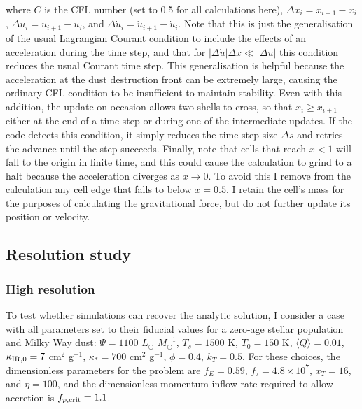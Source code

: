 \documentclass[useAMS,usenatbib]{mn2e}
\begin{document}
where $C$ is the CFL number (set to 0.5 for all calculations here), $\Delta x_i = x_{i+1} - x_i$, $\Delta u_i = u_{i+1}-u_i$, and $\Delta \dot{u}_i = \dot{u}_{i+1} - \dot{u}_i$. Note that this is just the generalisation of the usual Lagrangian Courant condition to include the effects of an acceleration during the time step, and that for $\left|\Delta \dot{u}\right| \Delta x \ll \left|\Delta u\right|$ this condition reduces the usual Courant time step. This generalisation is helpful because the acceleration at the dust destruction front can be extremely large, causing the ordinary CFL condition to be insufficient to maintain stability. Even with this addition, the update on occasion allows two shells to cross, so that $x_i \geq x_{i+1}$ either at the end of a time step or during one of the intermediate updates. If the code detects this condition, it simply reduces the time step size $\Delta s$ and retries the advance until the step succeeds. Finally, note that cells that reach $x < 1$ will fall to the origin in finite time, and this could cause the calculation to grind to a halt because the acceleration diverges as $x\rightarrow 0$. To avoid this I remove from the calculation any cell edge that falls to below $x = 0.5$. I retain the cell's mass for the purposes of calculating the gravitational force, but do not further update its position or velocity.


\subsection{Resolution study}

\subsubsection{High resolution}
\label{sssec:high_res}

To test whether simulations can recover the analytic solution, I consider a case with all parameters set to their fiducial values for a zero-age stellar population and Milky Way dust: $\Psi = 1100$ $L_\odot$ $M_\odot^{-1}$, $T_s = 1500$ K, $T_0 = 150$ K, $\langle Q\rangle = 0.01$, $\kappa_{\rm IR,0} = 7$ cm$^2$ g$^{-1}$, $\kappa_* = 700$ cm$^2$ g$^{-1}$, $\phi = 0.4$, $k_T = 0.5$. For these choices, the dimensionless parameters for the problem are $f_E = 0.59$, $f_\tau = 4.8\times 10^7$, $x_T = 16$, and $\eta = 100$, and the dimensionless momentum inflow rate required to allow accretion is $f_{p,\rm crit} = 1.1$. 
\end{document}
